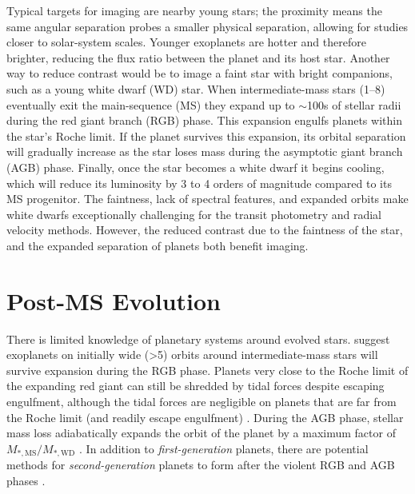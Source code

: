 \documentclass[twocolumn]{aastex631}
\begin{document}
Typical targets for imaging are nearby young stars; the proximity means the same angular separation probes a smaller physical separation, allowing for studies closer to solar-system scales. Younger exoplanets are hotter and therefore brighter, reducing the flux ratio between the planet and its host star. Another way to reduce contrast would be to image a faint star with bright companions, such as a young white dwarf (WD) star. When intermediate-mass stars (\qtyrange{1}{8}{\solarmass}) eventually exit the main-sequence (MS) they expand up to $\sim$100s of stellar radii during the red giant branch (RGB) phase. This expansion engulfs planets within the star's Roche limit. If the planet survives this expansion, its orbital separation will gradually increase as the star loses mass during the asymptotic giant branch (AGB) phase. Finally, once the star becomes a white dwarf it begins cooling, which will reduce its luminosity by 3 to 4 orders of magnitude compared to its MS progenitor. The faintness, lack of spectral features, and expanded orbits make white dwarfs exceptionally challenging for the transit photometry and radial velocity methods. However, the reduced contrast due to the faintness of the star, and the expanded separation of planets both benefit imaging.

\section{Post-MS Evolution}

There is limited knowledge of planetary systems around evolved stars. \citet{burleigh_imaging_2002,veras_post-main-sequence_2016} suggest exoplanets on initially wide (\textgreater\qty{5}{\au}) orbits around intermediate-mass stars will survive expansion during the RGB phase. Planets very close to the Roche limit of the expanding red giant can still be shredded by tidal forces despite escaping engulfment, although the tidal forces are negligible on planets that are far from the Roche limit (and readily escape engulfment) \citep{nordhaus_orbits_2013}. During the AGB phase, stellar mass loss adiabatically expands the orbit of the planet by a maximum factor of $M_{*,\mathrm{MS}}/M_{*,\mathrm{WD}}$ \citep{jeans_cosmogonic_1924}. In addition to \textit{first-generation} planets, there are potential methods for \textit{second-generation} planets to form after the violent RGB and AGB phases \citep{perets_second_2010}.
\end{document}
